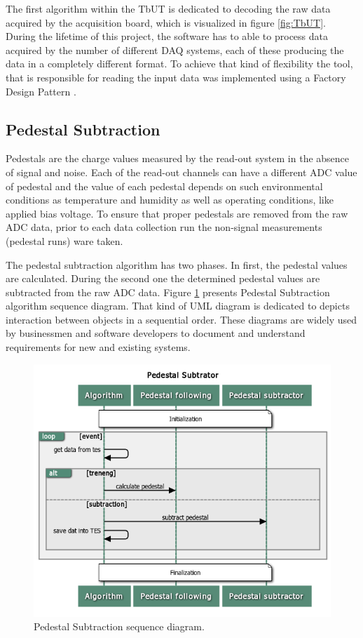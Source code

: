The first algorithm within the TbUT is dedicated to decoding the raw data acquired by the acquisition board, which is visualized in figure \ref{fig:TbUT}.  
During the lifetime of this project, the software has to able to process data acquired by the number of different DAQ systems, each of these producing the data in a completely different format.  To achieve that kind of flexibility the tool, that is responsible for reading the input data was implemented using a Factory Design Pattern \cite{DesignPatterns}. 

\subsection{Pedestal Subtraction}

Pedestals are the charge values measured by the read-out system in the absence of signal and noise. Each of the read-out channels can have a different ADC value of pedestal and the value of each pedestal depends on such environmental conditions as temperature and humidity as well as operating conditions, like applied bias voltage. 
To ensure that proper pedestals are removed from the raw ADC data, prior to each data collection run the non-signal measurements (pedestal runs) ware taken. 

The pedestal subtraction algorithm has two phases. In first, the pedestal values are calculated. During the second one the determined pedestal values are subtracted from the raw ADC data. Figure \ref{fig:ped} presents Pedestal Subtraction algorithm sequence diagram. That kind of UML diagram \cite{UML} is dedicated to depicts interaction between objects in a sequential order. These diagrams are widely used by businessmen and software developers to document and understand requirements for new and existing systems. 

\begin{figure}
\centering
\includegraphics[scale=0.6]{figures/Pedestal_Subtrator.png}
\caption{Pedestal Subtraction sequence diagram.}
\label{fig:ped}
\end{figure}



